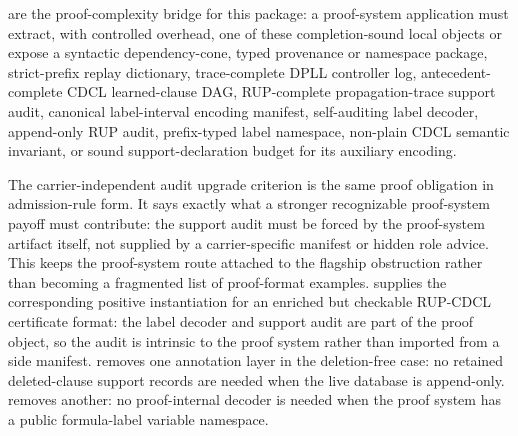 \documentclass[11pt]{article}
\theoremstyle{definition}
\begin{document}
 are the proof-complexity bridge for this package: a proof-system application must extract, with controlled overhead, one of these completion-sound local objects or expose a syntactic dependency-cone, typed provenance or namespace package, strict-prefix replay dictionary, trace-complete DPLL controller log, antecedent-complete CDCL learned-clause DAG, RUP-complete propagation-trace support audit, canonical label-interval encoding manifest, self-auditing label decoder, append-only RUP audit, prefix-typed label namespace, non-plain CDCL semantic invariant, or sound support-declaration budget for its auxiliary encoding.

The carrier-independent audit upgrade criterion is the same proof obligation in
admission-rule form.  It says exactly what a stronger recognizable proof-system
payoff must contribute: the support audit must be forced by the proof-system
artifact itself, not supplied by a carrier-specific manifest or hidden role
advice.  This keeps the proof-system route attached to the flagship obstruction
rather than becoming a fragmented list of proof-format examples.
 supplies the corresponding positive
instantiation for an enriched but checkable RUP-CDCL certificate format: the
label decoder and support audit are part of the proof object, so the audit is
intrinsic to the proof system rather than imported from a side manifest.
 removes one annotation layer in
the deletion-free case: no retained deleted-clause support records are needed
when the live database is append-only.  
removes another: no proof-internal decoder is needed when the proof system has a
public formula-label variable namespace.
\end{document}
